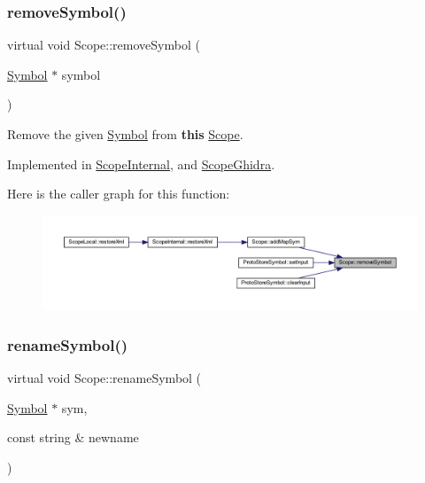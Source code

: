 \subsubsection{\texorpdfstring{removeSymbol()}{removeSymbol()}}
{\footnotesize\ttfamily virtual void Scope\+::remove\+Symbol (\begin{DoxyParamCaption}\item[{\mbox{\hyperlink{class_symbol}{Symbol}} $\ast$}]{symbol }\end{DoxyParamCaption})\hspace{0.3cm}{\ttfamily [pure virtual]}}



Remove the given \mbox{\hyperlink{class_symbol}{Symbol}} from {\bfseries{this}} \mbox{\hyperlink{class_scope}{Scope}}. 



Implemented in \mbox{\hyperlink{class_scope_internal_a77c1ceb048a903b047c1e52108890979}{Scope\+Internal}}, and \mbox{\hyperlink{class_scope_ghidra_af54aaf6bcabc70b6b705fd1b49ecd720}{Scope\+Ghidra}}.

Here is the caller graph for this function\+:
\nopagebreak
\begin{figure}[H]
\begin{center}
\leavevmode
\includegraphics[width=350pt]{class_scope_a0172591847f6a1b338ad324f28732f7f_icgraph}
\end{center}
\end{figure}
\mbox{\label{class_scope_ab576de2e768be9507ee03faa163c1ddf}} 
\subsubsection{\texorpdfstring{renameSymbol()}{renameSymbol()}}
{\footnotesize\ttfamily virtual void Scope\+::rename\+Symbol (\begin{DoxyParamCaption}\item[{\mbox{\hyperlink{class_symbol}{Symbol}} $\ast$}]{sym,  }\item[{const string \&}]{newname }\end{DoxyParamCaption})\hspace{0.3cm}{\ttfamily [pure virtual]}}



